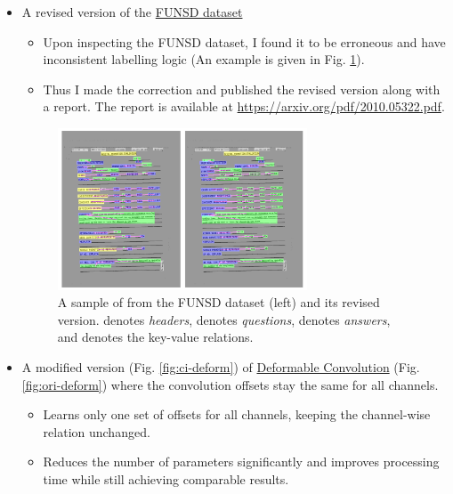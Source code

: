 \documentclass[english,report,10pt]{extarticle}
\newcommand{\dotyellow}{\textcolor{customyellow}{\ding{108}}\hspace{.5ex}}
\newcommand{\dotpink}{\textcolor{custompink}{\ding{108}}\hspace{.5ex}}
\newcommand{\dotgreen}{\textcolor{customgreen}{\ding{108}}\hspace{.5ex}}
\newcommand{\dotblue}{\textcolor{customblue}{\ding{108}}\hspace{.5ex}}
\begin{document}
\begin{itemize}
    \item A revised version of the \href{https://arxiv.org/abs/1905.13538}{FUNSD dataset}

          \begin{itemize}
              \item Upon inspecting the FUNSD dataset, I found it to be erroneous and have inconsistent labelling logic (An example is given in Fig. \ref{fig:funsd-vs-revised}).
              \item Thus I made the correction and published the revised version along with a report. The report is available at \url{https://arxiv.org/pdf/2010.05322.pdf}.
          \end{itemize}
          \begin{figure}[H]
              \centering
              \includegraphics[width=0.7\textwidth]{funsd-vs-revised.png}
              \caption{A sample of from the FUNSD dataset (left) and its revised version. \dotyellow{} denotes \textit{headers}, \dotblue{} denotes \textit{questions}, \dotgreen{} denotes \textit{answers}, and \dotpink{} denotes the key-value relations.}
              \label{fig:funsd-vs-revised}
          \end{figure}

    \item A modified version (Fig. \ref{fig:ci-deform}) of \href{https://arxiv.org/abs/1703.06211}{Deformable Convolution} (Fig. \ref{fig:ori-deform}) where the convolution offsets stay the same for all channels.
          \begin{itemize}
              \item Learns only one set of offsets for all channels, keeping the channel-wise relation unchanged.
              \item Reduces the number of parameters significantly and improves processing time while still achieving comparable results.
          \end{itemize}


\end{itemize}
\end{document}
